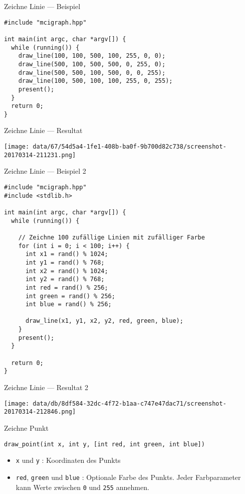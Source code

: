 \documentclass[presentation]{beamer}
\begin{document}
\begin{frame}[label={sec:org7087f8a},fragile]{Zeichne Linie --- Beispiel}
 \begin{verbatim}
#include "mcigraph.hpp"

int main(int argc, char *argv[]) {
  while (running()) {
    draw_line(100, 100, 500, 100, 255, 0, 0);
    draw_line(500, 100, 500, 500, 0, 255, 0);
    draw_line(500, 500, 100, 500, 0, 0, 255);
    draw_line(100, 500, 100, 100, 255, 0, 255);
    present();
  }
  return 0;
}
\end{verbatim}
\end{frame}
\begin{frame}[label={sec:org5dad03a}]{Zeichne Linie --- Resultat}
\begin{center}
\texttt{[image: data/67/54d5a4-1fe1-408b-ba0f-9b700d82c738/screenshot-20170314-211231.png]}
\end{center}
\end{frame}
\begin{frame}[label={sec:org58a1ec5},fragile]{Zeichne Linie --- Beispiel 2}
 \begin{verbatim}
#include "mcigraph.hpp"
#include <stdlib.h>

int main(int argc, char *argv[]) {
  while (running()) {

    // Zeichne 100 zufällige Linien mit zufälliger Farbe
    for (int i = 0; i < 100; i++) {
      int x1 = rand() % 1024;
      int y1 = rand() % 768;
      int x2 = rand() % 1024;
      int y2 = rand() % 768;
      int red = rand() % 256;
      int green = rand() % 256;
      int blue = rand() % 256;

      draw_line(x1, y1, x2, y2, red, green, blue);
    }
    present();
  }

  return 0;
}
\end{verbatim}
\end{frame}
\begin{frame}[label={sec:org3a50275}]{Zeichne Linie --- Resultat 2}
\begin{center}
\texttt{[image: data/db/8df584-32dc-4f72-b1aa-c747e47dac71/screenshot-20170314-212846.png]}
\end{center}
\end{frame}
\begin{frame}[label={sec:org1ac2299},fragile]{Zeichne Punkt}
 \begin{verbatim}
draw_point(int x, int y, [int red, int green, int blue])
\end{verbatim}
\begin{itemize}
\item {\color{solarizedYellow}\verb!x!} und {\color{solarizedYellow}\verb!y!} : Koordinaten des Punkts
\item {\color{solarizedYellow}\verb!red!}, {\color{solarizedYellow}\verb!green!} und {\color{solarizedYellow}\verb!blue!} : Optionale Farbe des Punkts. Jeder
Farbparameter kann Werte zwischen {\color{solarizedYellow}\verb!0!} und {\color{solarizedYellow}\verb!255!} annehmen.
\end{itemize}
\end{frame}
\end{document}
